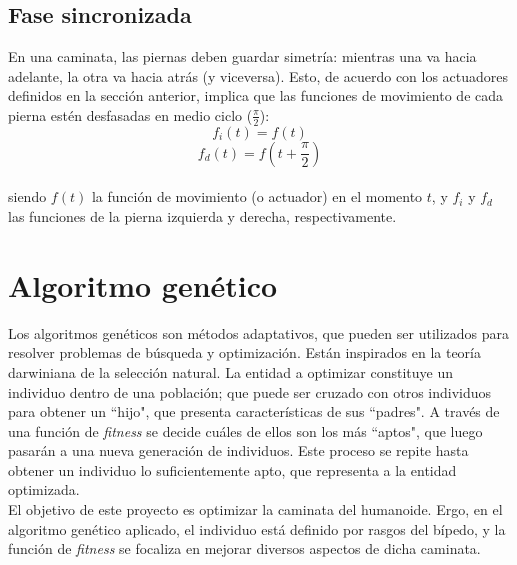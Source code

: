 \documentclass{article}
\begin{document}
\subsection{Fase sincronizada}
En una caminata, las piernas deben guardar simetr\'ia: mientras una va hacia adelante, la otra va hacia atr\'as (y viceversa). Esto, de acuerdo con  los actuadores definidos en la secci\'on anterior, implica que las funciones de movimiento de cada pierna est\'en desfasadas en medio ciclo ($\frac{\pi}{2}$):\\
\begin{equation}
f_{i}(t) =  f(t)
 \end{equation}
 \begin{equation}
f_{d}(t) =  f(t+\frac{\pi}{2})
 \end{equation}
 \\
siendo $f(t)$ la funci\'on de movimiento (o actuador) en el momento $t$, y $f_{i}$ y $f_{d}$ las funciones de la pierna izquierda y derecha, respectivamente.\\



\section{Algoritmo gen\'etico}

Los algoritmos gen\'eticos son m\'etodos adaptativos, que pueden ser utilizados para resolver problemas de b\'usqueda y optimizaci\'on. Est\'an inspirados en la teor\'ia darwiniana de la selecci\'on natural. La entidad a optimizar constituye un individuo dentro de una poblaci\'on; que puede ser cruzado con otros individuos para obtener un ``hijo", que presenta caracter\'isticas de sus ``padres". A trav\'es de una funci\'on de \textit{fitness} se decide cu\'ales de ellos son los m\'as ``aptos", que luego pasar\'an a una nueva generaci\'on de individuos. Este proceso se repite hasta obtener un individuo lo suficientemente apto, que representa a la entidad optimizada.\\
El objetivo de este proyecto es optimizar la caminata del humanoide. Ergo, en el algoritmo gen\'etico aplicado, el individuo est\'a definido por rasgos del b\'ipedo, y la funci\'on de \textit{fitness} se focaliza en mejorar diversos aspectos de dicha caminata.
\end{document}
